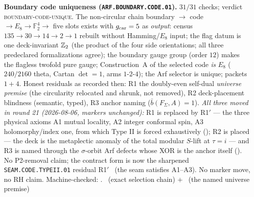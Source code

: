 \par\smallskip\noindent\textbf{Boundary code uniqueness
(\texttt{ARF.BOUNDARY.CODE.01}).}
$31/31$ checks; verdict \textsc{boundary-code-unique}.  The
non-circular chain boundary $\to$ code $\to E_8\to\mathbb
F_2^4\to$ five slots exists with $g_{\mathrm{car}}=5$ as \emph{output}:
census $135\to30\to14\to2\to1$ rebuilt without Hamming/$E_8$
input; the flag datum is one deck-invariant $\mathbb{Z}_2$ (the product of
the four side orientations; all three predeclared formalizations
agree); the boundary gauge group (order $12$) makes the flagless
twofold pure gauge; Construction~A of the selected code \emph{is}
$E_8$ ($240/2160$ theta, Cartan $\det=1$, arms $1$-$2$-$4$); the
Arf selector is unique; packets $1+4$.  Honest residuals as
recorded then: R1 the doubly-even self-dual \emph{universe premise}
(the circularity relocated and shrunk, not removed), R2
deck-placement blindness (semantic, typed), R3 anchor naming
($\bar b(F_\Sigma,A)=1$).  \emph{All three moved in round 21
(2026-08-06, markers unchanged):} R1 is replaced by R1$'$ --- the
three physical axioms A1 mutual locality, A2 integer conformal
spin, A3 holomorphy/index one, from which Type II is forced
exhaustively (); R2 is placed
--- the deck is the metaplectic anomaly of the total modular
$S$-lift at $\tau=i$ --- and R3 is named through the
$\sigma$-orbit Arf defects whose XOR is the anchor itself
().  No P2-removal
claim; the contract form is now the sharpened
\texttt{SEAM.CODE.TYPEII.01} residual R1$'$ \mC\ (the seam
satisfies A1--A3).  No marker move, no RH claim.
Machine-checked: .
\mE\ (exact selection chain) $+$ \mO\ (the named universe premise)
\par\smallskip

